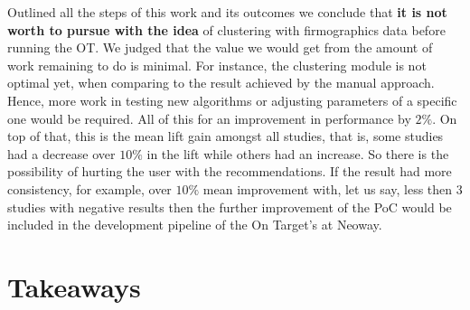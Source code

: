 Outlined all the steps of this work and its outcomes we conclude that \textbf{it is not worth to pursue with the idea} of clustering with firmographics data before running the OT. We judged that the value we would get from the amount of work remaining to do is minimal. For instance, the clustering module is not optimal yet, when comparing to the result achieved by the manual approach. Hence, more work in testing new algorithms or adjusting parameters of a specific one would be required. All of this for an improvement in performance by $2\%$. On top of that, this is the mean lift gain amongst all studies, that is, some studies had a decrease over $10\%$ in the lift while others had an increase. So there is the possibility of hurting the user with the recommendations. If the result had more consistency, for example, over $10\%$ mean improvement with, let us say, less then 3 studies with negative results then the further improvement of the PoC  would be included in the development pipeline of the On Target's at Neoway. 

\section{Takeaways}

